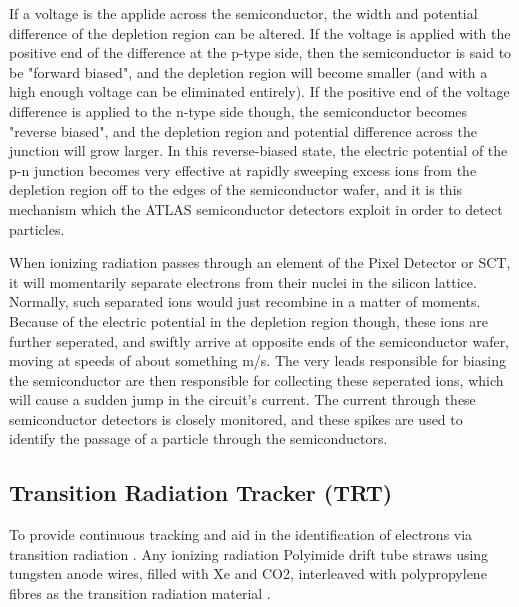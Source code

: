         If a voltage is the applide across the semiconductor, the width and potential difference of the depletion region can be altered.
        If the voltage is applied with the positive end of the difference at the p-type side, then the semiconductor is said to be "forward biased", and the depletion region will become smaller (and with a high enough voltage can be eliminated entirely). \cite{wiley_radiation_detection}
        If the positive end of the voltage difference is applied to the n-type side though, the semiconductor becomes "reverse biased", and the depletion region and potential difference across the junction will grow larger.
        In this reverse-biased state, the electric potential of the p-n junction becomes very effective at rapidly sweeping excess ions from the depletion region off to the edges of the semiconductor wafer, and it is this mechanism which the ATLAS semiconductor detectors exploit in order to detect particles.

        When ionizing radiation passes through an element of the Pixel Detector or SCT, it will momentarily separate electrons from their nuclei in the silicon lattice.
        Normally, such separated ions would just recombine in a matter of moments.
        Because of the electric potential in the depletion region though, these ions are further seperated, and swiftly arrive at opposite ends of the semiconductor wafer, moving at speeds of about something m/s.%
        The very leads responsible for biasing the semiconductor are then responsible for collecting these seperated ions, which will cause a sudden jump in the circuit's current.
        The current through these semiconductor detectors is closely monitored, and these spikes are used to identify the passage of a particle through the semiconductors.




    \subsection{Transition Radiation Tracker (TRT)} %
            To provide continuous tracking and aid in the identification of electrons via transition radiation \cite{ID_DTR}.
            Any ionizing radiation
            Polyimide drift tube straws using tungsten anode wires, filled with Xe and CO2, interleaved with polypropylene fibres as the transition radiation material \cite{ATLAS_TDR}.

